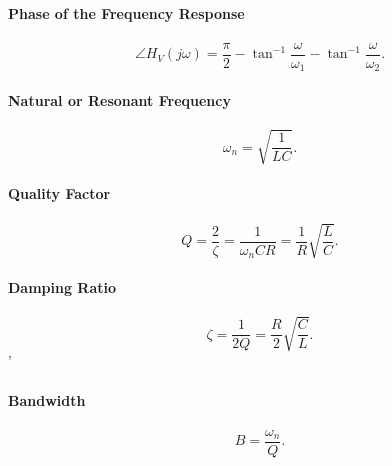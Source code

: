 \begin{symbols}
\end{symbols}

\paragraph{Phase of the Frequency Response}
\begin{equation*}
  \angle H_V(j\omega) = \frac{\pi}{2} - \tan^{-1} \frac{\omega}{\omega_1} - \tan^{-1} \frac{\omega}{\omega_2}
.\end{equation*}

\begin{symbols}
\end{symbols}

\paragraph{Natural or Resonant Frequency}
\begin{equation*}
  \omega_n = \sqrt{\frac{1}{LC}}
.\end{equation*}

\begin{symbols}
\end{symbols}

\paragraph{Quality Factor}
\begin{equation*}
  Q = \frac{2}{\zeta} = \frac{1}{\omega_n CR} = \frac{1}{R} \sqrt{\frac{L}{C}}
.\end{equation*}

\begin{symbols}
\end{symbols}

\paragraph{Damping Ratio}
\begin{equation*}
  \zeta = \frac{1}{2Q} = \frac{R}{2} \sqrt{\frac{C}{L}}
.\end{equation*}
'
\begin{symbols}
\end{symbols}

\paragraph{Bandwidth}
\begin{equation*}
  B = \frac{\omega_n}{Q}
.\end{equation*}

\begin{symbols}
\end{symbols}
